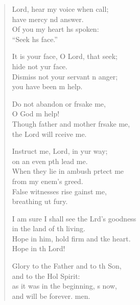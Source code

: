 \settowidth{\versewidth}{I am sure I shall see the Lord’s goodness *}
\begin{verse}%
  \begin{patverse}
 Lord, hear my voice when  call;\Med\\
have mercy nd answer.\\
Of you my heart hs spoken:\Med\\
“Seek h\pointup{\i}s face.”

It is your face, O Lord, that  seek;\Med\\
hide not yur face.\\
Dismiss not your servant \pointup{\i}n anger;\Med\\
you have been m help.

Do not abandon or frsake me,\Med\\
O God m help!\\
Though father and mother frsake me,\Med\\
the Lord will rceive me.

Instruct me, Lord, in yur way;\Med\\
on an even pth lead me.\\
When they lie in ambush prtect me\Med\\
from my enem’s greed.\\
False witnesses rise gainst me,\Med\\
breathing ut fury.

I am sure I shall see the Lrd’s goodness\Med\\
in the land of th living.\\
Hope in him, hold firm and tke heart.\Med\\
Hope in th Lord!

Glory to the Father and to th Son,\Med\\
and to the Hol Spirit:\\
as it was in the beginning, \pointup{\i}s now,\Med\\
and will be forever. men.
  \end{patverse}
\end{verse}
